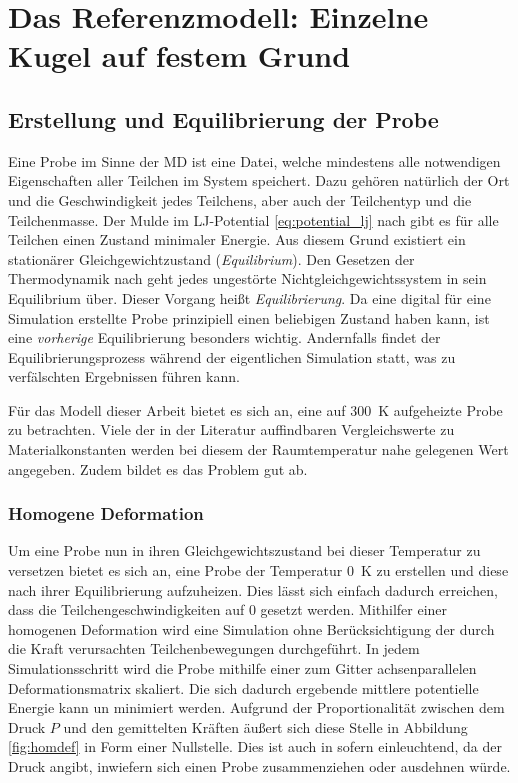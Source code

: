 \chapter{Das Referenzmodell: Einzelne Kugel auf festem Grund}



\section{Erstellung und Equilibrierung der Probe}
	Eine Probe im Sinne der MD ist eine Datei, welche mindestens alle notwendigen Eigenschaften
	aller Teilchen im System speichert. Dazu gehören natürlich der Ort und die Geschwindigkeit
	jedes Teilchens, aber auch der Teilchentyp und die Teilchenmasse. Der Mulde im LJ-Potential
	\eqref{eq:potential_lj} nach gibt es für alle Teilchen einen Zustand minimaler Energie.
	Aus diesem Grund existiert ein stationärer Gleichgewichtzustand (\emph{Equilibrium}). Den
	Gesetzen der Thermodynamik nach geht jedes ungestörte Nichtgleichgewichtssystem in sein
	Equilibrium über. Dieser Vorgang heißt \emph{Equilibrierung}. Da eine digital für eine
	Simulation erstellte Probe prinzipiell einen beliebigen Zustand haben kann, ist eine
	\emph{vorherige} Equilibrierung besonders wichtig. Andernfalls findet der
	Equilibrierungsprozess während der eigentlichen Simulation statt, was zu verfälschten
	Ergebnissen führen kann.

	Für das Modell dieser Arbeit bietet es sich an, eine auf \SI{300}{\kelvin} aufgeheizte Probe
	zu betrachten. Viele der in der Literatur auffindbaren Vergleichswerte zu Materialkonstanten
	werden bei diesem der Raumtemperatur nahe gelegenen Wert angegeben. Zudem bildet es das
	Problem gut ab.

	\subsection{Homogene Deformation}
		Um eine Probe nun in ihren Gleichgewichtszustand bei dieser Temperatur zu versetzen bietet
		es sich an, eine Probe der Temperatur \SI{0}{\kelvin} zu erstellen und diese nach ihrer
		Equilibrierung aufzuheizen. Dies lässt sich einfach dadurch erreichen, dass die
		Teilchengeschwindigkeiten auf 0 gesetzt werden. Mithilfer einer homogenen Deformation wird
		eine Simulation ohne Berücksichtigung der durch die Kraft verursachten Teilchenbewegungen
		durchgeführt. In jedem Simulationsschritt wird die Probe mithilfe einer zum Gitter
		achsenparallelen Deformationsmatrix skaliert. Die sich dadurch ergebende mittlere
		potentielle Energie kann un minimiert werden. Aufgrund der Proportionalität zwischen dem
		Druck $P$ und den gemittelten Kräften äußert sich diese Stelle in Abbildung
		\ref{fig:homdef} in Form einer Nullstelle. Dies ist auch in sofern einleuchtend, da der
		Druck angibt, inwiefern sich einen Probe zusammenziehen oder ausdehnen würde.

